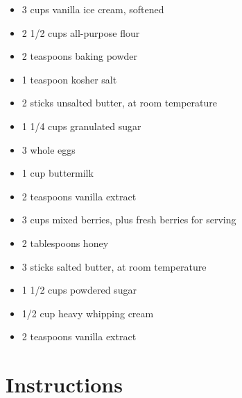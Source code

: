 \documentclass[
  letterpaper,
  DIV=11,
  numbers=noendperiod,
  titlepage=false]{scrreprt}
\providecommand{\tightlist}{%
  \setlength{\itemsep}{0pt}\setlength{\parskip}{0pt}}\usepackage{longtable,booktabs,array}
\begin{document}
\begin{itemize}
\tightlist
\item
  3 cups vanilla ice cream, softened
\item
  2 1/2 cups all-purpose flour
\item
  2 teaspoons baking powder
\item
  1 teaspoon kosher salt
\item
  2 sticks unsalted butter, at room temperature
\item
  1 1/4 cups granulated sugar
\item
  3 whole eggs
\item
  1 cup buttermilk
\item
  2 teaspoons vanilla extract
\item
  3 cups mixed berries, plus fresh berries for serving
\item
  2 tablespoons honey
\item
  3 sticks salted butter, at room temperature
\item
  1 1/2 cups powdered sugar
\item
  1/2 cup heavy whipping cream
\item
  2 teaspoons vanilla extract
\end{itemize}

\section{Instructions}\label{instructions-83}
\end{document}
